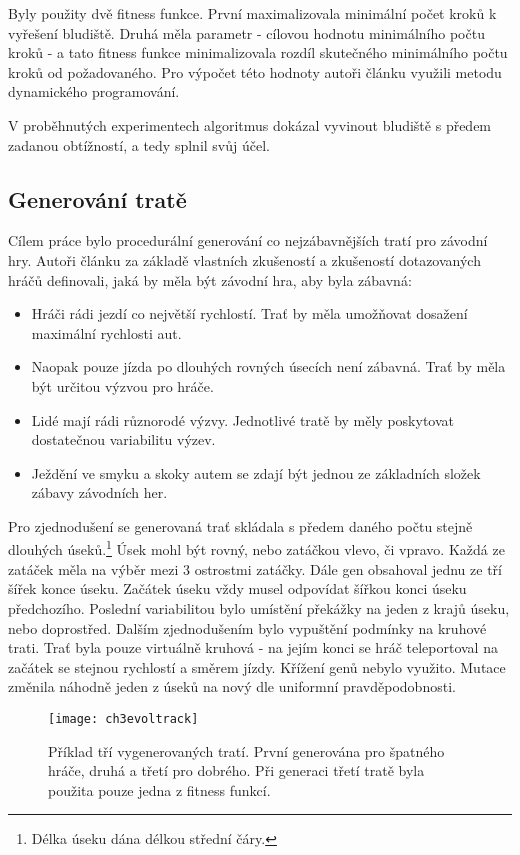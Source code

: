 Byly použity dvě fitness funkce. První maximalizovala minimální počet kroků k vyřešení bludiště. Druhá měla parametr - cílovou hodnotu minimálního počtu kroků - a tato fitness funkce minimalizovala rozdíl skutečného minimálního počtu kroků od požadovaného. Pro výpočet této hodnoty autoři článku využili metodu dynamického programování.

V proběhnutých experimentech algoritmus dokázal vyvinout bludiště s předem zadanou obtížností, a tedy splnil svůj účel.

\subsection{Generování tratě}

Cílem práce \cite{EvolTrack} bylo procedurální generování co nejzábavnějších tratí pro závodní hry. Autoři článku za základě vlastních zkušeností a zkušeností dotazovaných hráčů definovali, jaká by měla být závodní hra, aby byla zábavná:

\begin{itemize}
	\item Hráči rádi jezdí co největší rychlostí. Trať by měla umožňovat dosažení maximální rychlosti aut.
	\item Naopak pouze jízda po dlouhých rovných úsecích není zábavná. Trať by měla být určitou výzvou pro hráče.
	\item Lidé mají rádi různorodé výzvy. Jednotlivé tratě by měly poskytovat dostatečnou variabilitu výzev.
	\item Ježdění ve smyku a skoky autem se zdají být jednou ze základních složek zábavy závodních her.
\end{itemize}

Pro zjednodušení se generovaná trať skládala s předem daného počtu stejně dlouhých úseků.\footnote{Délka úseku dána délkou střední čáry.} Úsek mohl být rovný, nebo zatáčkou vlevo, či vpravo. Každá ze zatáček měla na výběr mezi 3 ostrostmi zatáčky. Dále gen obsahoval jednu ze tří šířek konce úseku. Začátek úseku vždy musel odpovídat šířkou konci úseku předchozího. Poslední variabilitou bylo umístění překážky na jeden z krajů úseku, nebo doprostřed. Dalším zjednodušením bylo vypuštění podmínky na kruhové trati. Trať byla pouze virtuálně kruhová - na jejím konci se hráč teleportoval na začátek se stejnou rychlostí a směrem jízdy. Křížení genů nebylo využito. Mutace změnila náhodně jeden z úseků na nový dle uniformní pravděpodobnosti.

\begin{figure}
  \centering
  \texttt{[image: ch3evoltrack]}
	\caption{Příklad tří vygenerovaných tratí. První generována pro špatného hráče, druhá a třetí pro dobrého. Při generaci třetí tratě byla použita pouze jedna z fitness funkcí. \cite{EvolTrack} }
	\label{fig-ch3evoltrack}
\end{figure}

